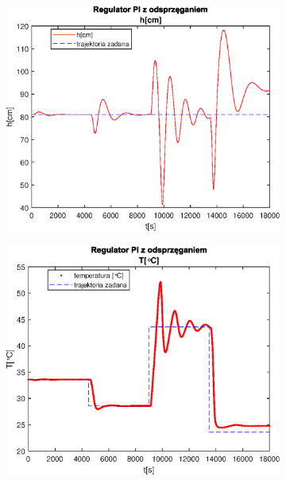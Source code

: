 \begin{figure}[h!]
   \centering
   \begin{subfigure}[b]{0.4\textwidth}
      \includegraphics[width=1\linewidth]{img/PI/decoupler/noDisturbance/PIDecouplerH3Linfalse.eps}
      \caption{}
      \label{fig:fig:PIDecoupler3Linfalse1}
   \end{subfigure}
       
   \begin{subfigure}[b]{0.4\textwidth}
      \includegraphics[width=1\linewidth]{img/PI/decoupler/noDisturbance/PIDecouplerT3Linfalse.eps}
      \caption{}
      \label{fig:fig:PIDecoupler3Linfalse2}
   \end{subfigure}
       

\end{figure}
